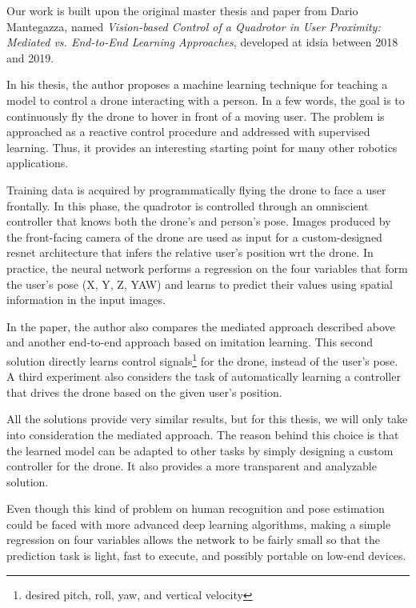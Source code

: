 Our work is built upon the original master thesis \cite{mantegazza2018thesis} and paper \cite{mantegazza2019visionbased} from Dario Mantegazza, named \textit{Vision-based Control of a Quadrotor in User Proximity: Mediated vs. End-to-End Learning Approaches}, developed at \gls{idsia} between 2018 and 2019.

\medskip

In his thesis, the author proposes a machine learning technique for teaching a model to control a drone interacting with a person. In a few words, the goal is to continuously fly the drone to hover in front of a moving user. The problem is approached as a reactive control procedure and addressed with supervised learning. Thus, it provides an interesting starting point for many other robotics applications.

Training data is acquired by programmatically flying the drone to face a user frontally. In this phase, the quadrotor is controlled through an omniscient controller that knows both the drone's and person's pose. Images produced by the front-facing camera of the drone are used as input for a custom-designed \gls{resnet} architecture that infers the relative user's position \gls{wrt} the drone. In practice, the neural network performs a regression on the four variables that form the user's pose (X, Y, Z, YAW) and learns to predict their values using spatial information in the input images.

In the paper, the author also compares the mediated approach described above and another end-to-end approach based on imitation learning. This second solution directly learns control signals\footnote{desired pitch, roll, yaw, and vertical velocity} for the drone, instead of the user's pose. A third experiment also considers the task of automatically learning a controller that drives the drone based on the given user's position.

All the solutions provide very similar results, but for this thesis, we will only take into consideration the mediated approach. The reason behind this choice is that the learned model can be adapted to other tasks by simply designing a custom controller for the drone. It also provides a more transparent and analyzable solution.

\medskip

Even though this kind of problem on human recognition and pose estimation could be faced with more advanced deep learning algorithms, making a simple regression on four variables allows the network to be fairly small so that the prediction task is light, fast to execute, and possibly portable on low-end devices.

